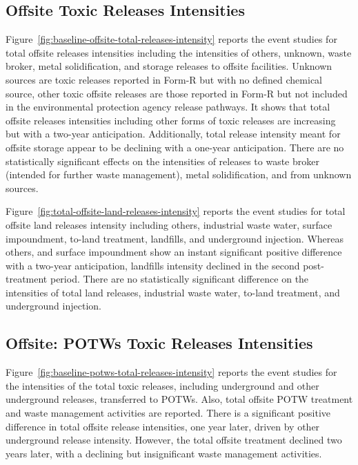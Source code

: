 \documentclass[authoryear, preprint, twocolumn, 1p]{elsarticle}
\begin{document}
    \subsection{Offsite Toxic Releases Intensities}\label{subsec:offsite-toxic-releases-intensities}
    Figure~\ref{fig:baseline-offsite-total-releases-intensity} reports the event studies for total offsite releases intensities including the intensities of others, unknown, waste broker, metal solidification, and storage releases to offsite facilities. Unknown sources are toxic releases reported in Form-R but with no defined chemical source, other toxic offsite releases are those reported in Form-R but not included in the environmental protection agency release pathways. It shows that total offsite releases intensities including other forms of toxic releases are increasing but with a two-year anticipation. Additionally, total release intensity meant for offsite storage appear to be declining with a one-year anticipation. There are no statistically significant effects on the intensities of releases to waste broker (intended for further waste management), metal solidification, and from unknown sources.
    

    Figure~\ref{fig:total-offsite-land-releases-intensity} reports the event studies for total offsite land releases intensity including others, industrial waste water, surface impoundment, to-land treatment, landfills, and underground injection. Whereas others, and surface impoundment show an instant significant positive difference with a two-year anticipation, landfills intensity declined in the second post-treatment period. There are no statistically significant difference on the intensities of total land releases, industrial waste water, to-land treatment, and underground injection.
    

    \subsection{Offsite: POTWs Toxic Releases Intensities}\label{subsec:potws-toxic-releases-intensities}
    Figure~\ref{fig:baseline-potws-total-releases-intensity} reports the event studies for the intensities of the total toxic releases, including underground and other underground releases, transferred to POTWs. Also, total offsite POTW treatment and waste management activities are reported. There is a significant positive difference in total offsite release intensities, one year later, driven by other underground release intensity. However, the total offsite treatment declined two years later, with a declining but insignificant waste management activities.
    
\end{document}
